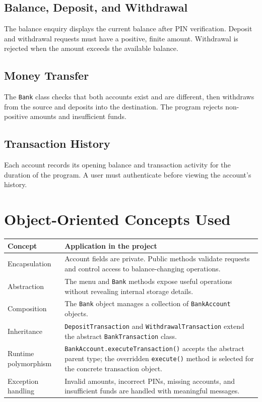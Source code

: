 \documentclass[11pt,a4paper]{report}
\begin{document}
\subsection{Balance, Deposit, and Withdrawal}
The balance enquiry displays the current balance after PIN verification. Deposit and withdrawal requests must have a positive, finite amount. Withdrawal is rejected when the amount exceeds the available balance.
\subsection{Money Transfer}
The \texttt{Bank} class checks that both accounts exist and are different, then withdraws from the source and deposits into the destination. The program rejects non-positive amounts and insufficient funds.
\subsection{Transaction History}
Each account records its opening balance and transaction activity for the duration of the program. A user must authenticate before viewing the account's history.

\clearpage
\section{Object-Oriented Concepts Used}
\begin{longtable}{|p{3.2cm}|p{10.5cm}|}\hline
\textbf{Concept} & \textbf{Application in the project}\\ \hline
Encapsulation & Account fields are private. Public methods validate requests and control access to balance-changing operations.\\ \hline
Abstraction & The menu and \texttt{Bank} methods expose useful operations without revealing internal storage details.\\ \hline
Composition & The \texttt{Bank} object manages a collection of \texttt{BankAccount} objects.\\ \hline
Inheritance & \texttt{DepositTransaction} and \texttt{WithdrawalTransaction} extend the abstract \texttt{BankTransaction} class.\\ \hline
Runtime polymorphism & \texttt{BankAccount.executeTransaction()} accepts the abstract parent type; the overridden \texttt{execute()} method is selected for the concrete transaction object.\\ \hline
Exception handling & Invalid amounts, incorrect PINs, missing accounts, and insufficient funds are handled with meaningful messages.\\ \hline
\end{longtable}
\end{document}
